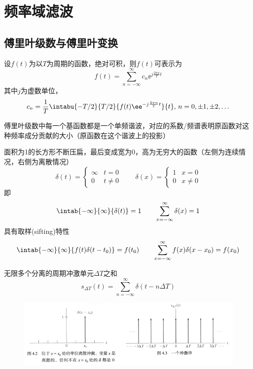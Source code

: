 
\section{频率域滤波}
\subsection{傅里叶级数与傅里叶变换}
\begin{definition}[傅里叶级数]
设$f(t)$为以$T$为周期的函数，绝对可积，则$f(t)$可表示为
\[f(t)=\sum_{n=-\infty}^{\infty}c_n\ee^{j\frac{2\pi n}{T}t}\]
其中$j$为虚数单位，
\[c_n=\frac{1}{T}\intabu{-T/2}{T/2}{f(t)\ee^{-j\frac{2\pi n}{T}t}}{t},\,n=0,\pm 1,\pm 2,\ldots\]
\end{definition}

傅里叶级数中每一个基函数都是一个单频谐波，对应的系数/频谱表明原函数对这种频率成分贡献的大小（原函数在这个谐波上的投影）

\begin{definition}
面积为1的长方形不断压扁，最后变成宽为0，高为无穷大的函数（左侧为连续情况，右侧为离散情况）
\[\delta(t)=\begin{cases}
\infty & t=0\\
0 & t\ne 0
\end{cases}\qquad
\delta(x)=\begin{cases}
1 & x=0\\
0 & x\ne 0
\end{cases}\]
即
\[\intab{-\infty}{\infty}{\delta(t)}=1
\qquad
\sum_{x=-\infty}^{\infty}\delta(x)=1\]
具有取样(sifting)特性
\[\intab{-\infty}{\infty}{f(t)\delta(t-t_0)}=f(t_0)
\qquad
\sum_{x=-\infty}^{\infty}f(x)\delta(x-x_0)=f(x_0)\]
\end{definition}
\begin{definition}[冲激串]
无限多个分离的周期冲激单元$\Delta T$之和
\[s_{\Delta T}(t)=\sum_{n=-\infty}^{\infty}\delta(t-n\Delta T)\]
\end{definition}
\begin{figure}[H]
\centering
\includegraphics[width=0.8\linewidth]{fig/impulse.png}
\end{figure}

